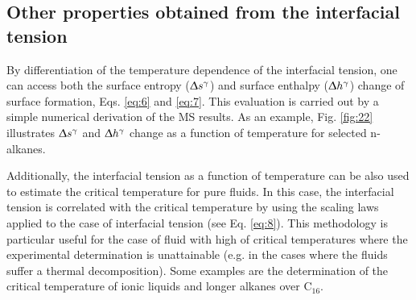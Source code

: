 \documentclass[9pt,tutorial]{livecoms}
\begin{document}
\subsection{Other properties obtained from the interfacial tension}

By differentiation of the temperature dependence of the interfacial tension,
one can access both  the surface entropy (${\Updelta}s^{{\gamma}}$)
and surface enthalpy (${\Updelta}h^{{\gamma}}$) change of surface
formation, Eqs. \ref{eq:6} and \ref{eq:7}. This evaluation is carried out by a simple
numerical derivation of the MS results. As an example, Fig. \ref{fig:22} illustrates
${\Updelta}s^{\mathrm{{\gamma}}}$ and
${\Updelta}h^{\mathrm{{\gamma}}}$ change as a function of
temperature for selected n-alkanes.

Additionally, the interfacial tension as a function of temperature can be also
used to estimate the critical temperature for pure fluids. In this case, the
interfacial tension is correlated with the critical temperature by using the
scaling laws applied to the case of interfacial tension (see Eq. \ref{eq:8}).
This methodology is particular useful for the case of fluid with high of
critical temperatures where the experimental determination is unattainable 
(e.g. in the cases where the fluids suffer a thermal decomposition). Some examples
are the determination of the critical temperature of ionic liquids and
longer alkanes over C$_{16}$.
\end{document}
